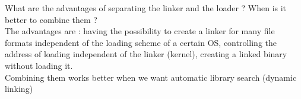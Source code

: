 \documentclass{article}
\begin{document}
\noindent What are the advantages of  separating the linker and the loader ? When is it better to combine them ?\\
The advantages are : having the possibility to create a linker for many file formats independent of the loading scheme of a certain OS, controlling the address of loading independent of the linker (kernel), creating a linked binary without loading it.\\
Combining them works better when we want automatic library search (dynamic linking)
\end{document}
